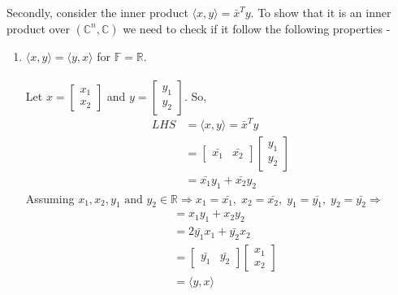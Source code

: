 \documentclass[a4paper]{article}
\begin{document}
\begin{qalist}
		
		Secondly, consider the inner product $\langle x,y \rangle = {\bar{x}}^{T}y$. To show that it is an inner product over $({\mathbb{C}}^{n}, \mathbb{C})$ we need to check if it follow the following properties - 
		\begin{enumerate}[label=\alph*., align=left]
			\item $\langle x,y \rangle = \langle y,x \rangle$ for $\mathbb{F} = \mathbb{R}$. \\ \\
				Let $x = \begin{bmatrix}{x}_{1} \\ {x}_{2}\end{bmatrix}$ and $y = \begin{bmatrix}{y}_{1} \\ {y}_{2}\end{bmatrix}$. So,
				\begin{align}
					LHS &= \langle x,y \rangle = {\bar{x}}^{T}y \\
					&= \begin{bmatrix}\bar{{x}_{1}} & \bar{{x}_{2}}\end{bmatrix} \begin{bmatrix}{y}_{1} \\ {y}_{2}\end{bmatrix} \\
					&= \bar{{x}_{1}}{y}_{1} + \bar{{x}_{2}}{y}_{2} 
				\end{align}
				Assuming ${x}_{1}, {x}_{2}, {y}_{1} \text{ and } {y}_{2} \in \mathbb{R} \Rightarrow {x}_{1} = \bar{{x}_{1}},\;{x}_{2} = \bar{{x}_{2}},\;{y}_{1} = \bar{{y}_{1}},\; {y}_{2} = \bar{{y}_{2}}\Rightarrow$			
				\begin{align}
					&= {x}_{1}{y}_{1} + {x}_{2}{y}_{2} \\
					&= 2\bar{{y}_{1}}{x}_{1} + \bar{{y}_{2}}{x}_{2} \\
					&= \begin{bmatrix}\bar{{y}_{1}} & \bar{{y}_{2}}\end{bmatrix} \begin{bmatrix}{x}_{1} \\ {x}_{2}\end{bmatrix} \\
					&= \langle y,x \rangle
				\end{align}	
				

\end{enumerate}
\end{qalist}
\end{document}
